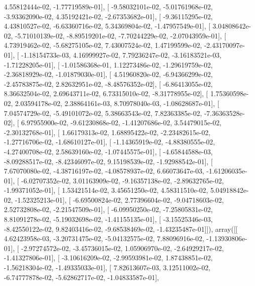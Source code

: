 \documentclass{article}
\begin{document}
          4.55812444e-02,  -1.77719589e-01],
       [ -9.58032101e-02,  -5.01761968e-02,  -3.93362090e-02,
          4.35192421e-02,  -2.67353682e-01],
       [ -9.36115295e-02,   4.43810527e-02,  -6.63360716e-02,
          5.34369804e-02,  -1.47957549e-01],
       [  3.04808642e-02,  -5.71010139e-02,  -8.89519201e-02,
         -7.70244229e-02,  -2.07043959e-01],
       [  4.73919462e-02,  -5.68275105e-02,   7.43007524e-02,
          1.47199599e-02,  -2.43170097e-01],
       [ -1.18154733e-03,   4.16999927e-02,   7.79236247e-02,
         -3.16183521e-03,  -1.71228205e-01],
       [ -1.01586368e-01,   1.12273486e-02,  -1.29619759e-02,
         -2.36818929e-02,  -1.01879030e-01],
       [  4.51960820e-02,  -6.94366299e-02,  -2.45783875e-02,
          2.82632951e-02,  -8.48576352e-02],
       [ -6.86413055e-02,   8.36632504e-02,   2.69643711e-02,
          6.73315010e-02,  -8.31778955e-02],
       [  1.75360598e-02,   2.03594178e-02,   2.38864161e-03,
          8.70978040e-03,  -1.08628687e-01],
       [  7.04574729e-02,  -5.49101072e-02,   5.38663543e-02,
          7.82363385e-02,  -7.36363528e-02],
       [  6.97955900e-02,  -9.61230868e-02,  -1.41207686e-02,
          3.54479015e-02,  -2.30132768e-01],
       [  1.66179313e-02,   1.68895422e-02,  -2.23482615e-02,
         -1.27716706e-02,  -1.68610127e-01],
       [ -1.14365919e-02,  -4.88380555e-02,  -4.27400708e-02,
          2.58639160e-02,  -1.07445575e-01],
       [ -4.65844588e-03,  -8.09288517e-02,  -8.42346097e-02,
          9.15198539e-02,  -1.92988542e-01],
       [  7.67070080e-02,  -4.38716197e-02,  -4.08578937e-02,
          6.66073647e-03,  -1.61206035e-01],
       [ -6.02707352e-02,   3.01163909e-02,  -9.16357138e-02,
         -2.89632765e-02,  -1.99371052e-01],
       [  1.53421514e-02,   3.45651250e-02,   4.58311510e-02,
          5.04918842e-02,  -1.52325213e-01],
       [ -6.69500824e-02,   2.77396604e-02,  -9.04718603e-02,
          2.52732808e-02,  -2.21547509e-01],
       [ -6.09950250e-02,  -7.25805831e-02,   8.81091278e-02,
         -5.19032698e-02,  -1.41155135e-01],
       [ -3.15525346e-03,  -8.42550122e-02,   9.82403416e-02,
         -9.68538469e-02,  -1.43235487e-01]]), array([[  4.62423958e-03,  -3.20731475e-02,  -5.04132575e-02,
          7.88096916e-02,  -1.13930806e-01],
       [ -2.97274572e-02,  -3.45736015e-02,   1.05906970e-02,
         -2.64929217e-02,  -1.41327806e-01],
       [ -3.10616209e-02,  -2.99593981e-02,   1.87438851e-02,
         -1.56218304e-02,  -1.49335033e-01],
       [  7.82613607e-03,   3.12511002e-02,  -6.74777878e-02,
         -5.62862717e-02,  -1.04833587e-01],
\end{document}
